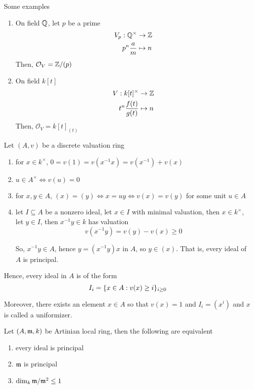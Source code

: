 \begin{remark}
	Some examples
	\begin{enumerate}
		\item On field $\mathbb{Q}$, let $p$ be a prime
		\begin{align*}
			V_p: \mathbb{Q}^\times &\to \mathbb{Z} \\
					p^n \frac{a}{m} &\mapsto n
		\end{align*}
		Then, $\mathcal{O}_V = \mathbb{Z} / (p)$
		
		\item On field $k[t]$
		\begin{align*}
			V: k[t]^\times &\to \mathbb{Z} \\
			t^n \frac{f(t)}{g(t)} &\mapsto n
		\end{align*}
		Then, $\mathcal{O}_V = k[t]_{(t)}$		
	\end{enumerate}
\end{remark}

\begin{remark}
	Let $(A, v)$ be a discrete valuation ring
	\begin{enumerate}
		\item for $x \in k^\times$, $0 = v(1) = v(x^{-1} x) = v(x^{-1}) + v(x)$
		\item $u \in A^\times \iff v(u) = 0$
		\item for $x, y \in A$, $(x) = (y) \iff x = uy \iff v(x) = v(y)$ for some unit $u \in A$
		\item let $I \subseteq A$ be a nonzero ideal, let $x \in I$ with minimal valuation, then $x \in k^\times$, let $y \in I$, then $x^{-1} y \in k$ has valuation
		$$
			v(x^{-1} y) = v(y) - v(x) \geq 0
		$$
		
		So, $x^{-1} y \in A$, hence $y = (x^{-1} y) x$ in $A$, so $y \in (x)$. That is, every ideal of $A$ is principal.
	\end{enumerate}
	Hence, every ideal in $A$ is of the form
	$$
		I_i = \{x \in A: v(x) \geq i\}_{i \geq 0}
	$$
	
	Moreover, there exists an element $x \in A$ so that $v(x) = 1$ and $I_i = (x^i)$ and $x$ is called a uniformizer.
\end{remark}

\begin{lemma}
	Let $(A, \mathfrak{m}, k)$ be Artinian local ring, then the following are equivalent
	\begin{enumerate}
		\item every ideal is principal
		\item $\mathfrak{m}$ is principal
		\item $\dim_k \mathfrak{m} / \mathfrak{m}^2 \leq 1$
	\end{enumerate}
\end{lemma}

